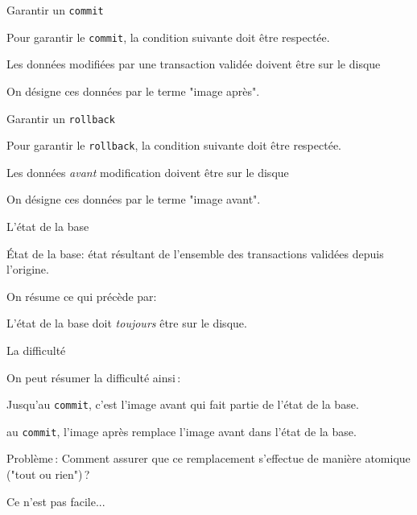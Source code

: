 \documentclass[aspectratio=169, handout]{beamer} %
\begin{document}
\begin{frame}{Garantir un \texttt{commit}}

Pour garantir le \texttt{commit}, la condition suivante doit être respectée.
\vfill

\centerline{\alert{Les données modifiées par une transaction validée doivent
être sur le disque}}

\vfill


On désigne  ces données par le terme "image après".

\end{frame}


\begin{frame}{Garantir un \texttt{rollback}}

Pour garantir le \texttt{rollback}, la condition suivante doit être respectée.
\vfill

\centerline{\alert{Les données \emph{avant} modification doivent
être sur le disque}}

\vfill

On désigne  ces données par le terme "image avant".

\end{frame}

\begin{frame}{L'état de la base}

\alert{\'Etat de la base}: état résultant de l'ensemble des transactions \alert{validées} 
depuis l'origine.

\bigskip

On résume ce qui précède par:

\bigskip

\centerline{\alert{L'état de la base doit \emph{toujours} être sur le disque.}}

\end{frame}


\begin{frame}{La difficulté}


On peut résumer la difficulté ainsi\,:

\vfill

\begin{redbullet}
   \item Jusqu'au \texttt{commit}, c'est \alert{l'image avant} qui 
       fait partie de l'état de la base.
     \item au \texttt{commit},  \alert{l'image après} remplace  \alert{l'image avant}
     dans l'état de la base.
\end{redbullet}

\vfill

\begin{blocgauche}
\alert{Problème}\,: Comment assurer que ce remplacement s'effectue de manière \alert{atomique} ("tout ou rien")\,?

\medskip

\vfill
\alert{Ce n'est pas facile...}

\end{blocgauche}

\end{frame}
\end{document}
